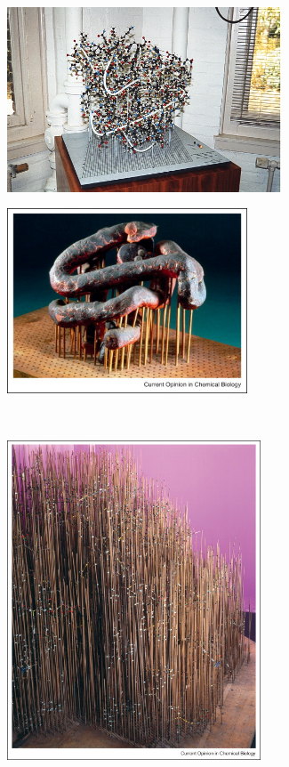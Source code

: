 \begin{figure}
  \begin{subfigure}{.5\textwidth}
  \centering
  {\includegraphics[height=5.5cm]{./figures/ch1/kendrew_myoglobin_ball_and_spokes}}
  \caption{}
    \label{Fig:kendrew_myoglobin_ball_and_spokes}
  \end{subfigure}%
  \begin{subfigure}{.5\textwidth}
  \centering
  {\includegraphics[height=5.5cm]{./figures/ch1/kendrew_myoglobin_plasticine}}
  \caption{}
  \label{Fig:kendrew_plasticine}
  \end{subfigure}%
  \\[\baselineskip]
  \begin{subfigure}{.5\textwidth}
  \centering
  {\includegraphics[height=9.5cm]{./figures/ch1/kendrew_myoglobin_forest_of_rods}}    

\end{subfigure}
\end{figure}
